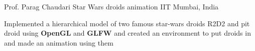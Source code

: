 \begin{cventries}
	\cventry
	{Prof. Parag Chaudari} %
	{Star Wars droids animation} %
	{IIT Mumbai, India} %
	{} %
	{
		\begin{cvitems} %
			\item {Implemented a hierarchical model of two famous star-wars droids R2D2 and pit droid using \textbf{OpenGL} and \textbf{GLFW} and created an environment to put droids in and made an animation using them}
		\end{cvitems}
	}

\end{cventries}
